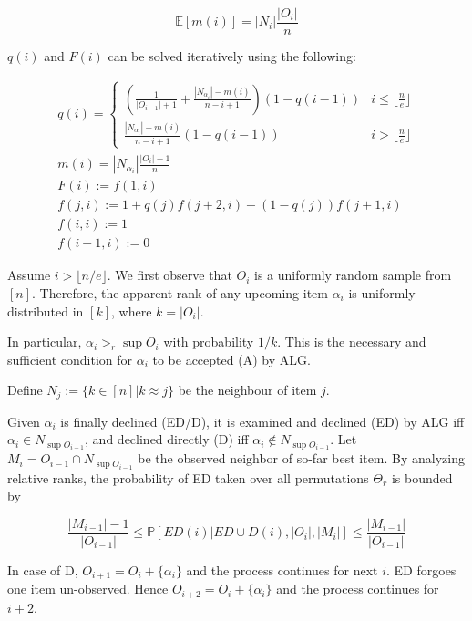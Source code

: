 \documentclass{article}
\newcommand{\prob}{\mathbb{P}}
\newcommand{\expec}{\mathbb{E}}
\begin{document}
\begin{equation*}
\expec[m(i)] = |N_i|\frac{|O_i|}{n}
\end{equation*}

$q(i)$ and $F(i)$ can be solved iteratively using the following:

\begin{gather*}
q(i)= \begin{cases}
\left(\frac{1}{|O_{i-1}|+1} + \frac{|N_{\alpha_i}|-m(i)}{n-i+1}\right)(1-q(i-1)) &i\leq\lfloor\frac{n}{e}\rfloor \\
\frac{|N_{\alpha_i}|-m(i)}{n-i+1}(1-q(i-1)) &i>\lfloor\frac{n}{e}\rfloor
\end{cases} \\
m(i) = |N_{\alpha_i}|\frac{|O_i|-1}{n} \\
F(i) := f(1,i)\\
f(j,i) := 1+q(j)f(j+2,i) + (1-q(j))f(j+1,i)\\
f(i,i) := 1\\
f(i+1,i) := 0
\end{gather*}

\newpage

\newcommand{\ALG}{\text{ALG}}

Assume $i > \lfloor n/e \rfloor $. We first observe that $O_i$ is a uniformly random sample from $[n]$. Therefore, the apparent rank of any upcoming item $\alpha_i$ is uniformly distributed in $[k]$, where $k = |O_i|$.

In particular, $\alpha_i >_r \sup O_i$ with probability $1/k$. This is the necessary and sufficient condition for $\alpha_i$ to be accepted (A) by $\ALG$.

Define $N_j := \{k\in[n] | k \approx j\}$ be the neighbour of item $j$.

Given $\alpha_i$ is finally declined (ED/D), it is examined and declined (ED) by $\ALG$ iff $\alpha_i \in N_{\sup O_{i-1}}$, and declined directly (D) iff $\alpha_i \not \in  N_{\sup O_{i-1}}$. Let $M_i = O_{i-1}\cap N_{\sup O_{i-1}}$ be the observed neighbor of so-far best item. By analyzing relative ranks, the probability of ED taken over all permutations $\Theta_r$ is bounded by

\begin{equation}\label{ED given D bound}
\frac{|M_{i-1}|-1}{|O_{i-1}|} \leq
\prob[ED(i) | ED \cup D(i), |O_i|, |M_i|] \leq
\frac{|M_{i-1}|}{|O_{i-1}|}
\end{equation}

In case of D, $O_{i+1} = O_i + \{\alpha_i\}$ and the process continues for next $i$. ED forgoes one item un-observed. Hence $O_{i+2} = O_i + \{\alpha_i\}$ and the process continues for $i+2$.
\end{document}
